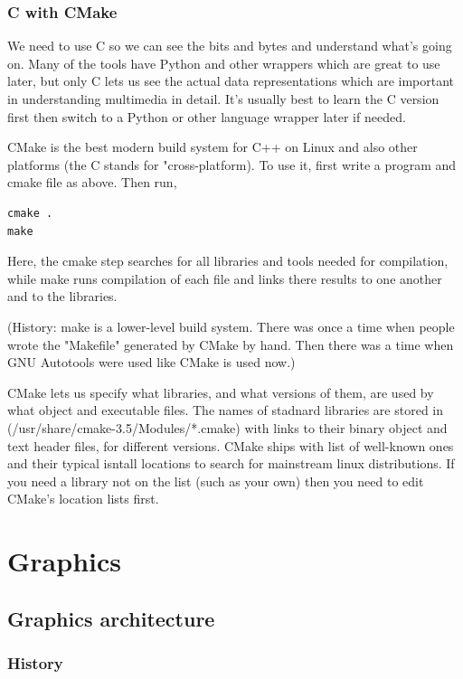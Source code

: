 \documentclass[oneside,english]{scrbook}
\begin{document}
\section{C with CMake}

We need to use C so we can see the bits and bytes and understand what's going on.  Many of the tools have Python and other wrappers which are great to use later, but only C lets us see the actual data representations which are important in understanding multimedia in detail.  It's usually best to learn the C version first then switch to a Python or other language wrapper later if needed.




CMake is the best modern build system for C++ on Linux and also other platforms (the C stands for "cross-platform).  To use it, first write a program and cmake file as above. Then run,
\begin{lstlisting}
cmake .
make
\end{lstlisting}

Here, the cmake step searches for all libraries and tools needed for compilation, while make runs compilation of each file and links there results to one another and to the libraries.

(History: make is a lower-level build system. There was once a time when people wrote the "Makefile" generated by CMake by hand.  Then there was a time when GNU Autotools were used like CMake is used now.)

CMake lets us specify what libraries, and what versions of them,  are used by what object and executable files.  The names of stadnard libraries are stored in (/usr/share/cmake-3.5/Modules/*.cmake) with links to their binary object and text header files, for different versions.  CMake ships with list of well-known ones and their typical isntall locations to search for mainstream linux distributions. If you need a library not on the list (such as your own) then you need to edit CMake's location lists first.
\part{Graphics}


\chapter{Graphics architecture}

\section{History}
\end{document}
